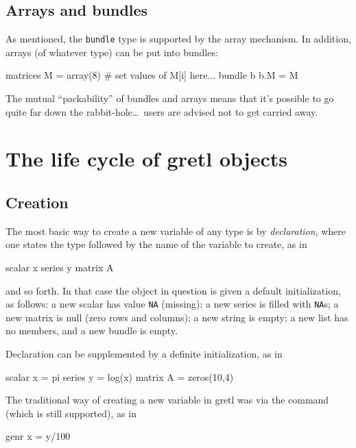 \subsection{Arrays and bundles}

As mentioned, the \texttt{bundle} type is supported by the array
mechanism. In addition, arrays (of whatever type) can be put into
bundles:
\begin{code}
matrices M = array(8)
# set values of M[i] here...
bundle b
b.M = M
\end{code}

The mutual ``packability'' of bundles and arrays means that it's
possible to go quite far down the rabbit-hole\dots\ users are advised
not to get carried away.

\section{The life cycle of gretl objects}

\subsection{Creation}

The most basic way to create a new variable of any type is by
\textit{declaration}, where one states the type followed by the name
of the variable to create, as in

\begin{code}
scalar x
series y
matrix A
\end{code}

and so forth. In that case the object in question is given a default
initialization, as follows: a new scalar has value \texttt{NA}
(missing); a new series is filled with \texttt{NA}s; a new matrix is
null (zero rows and columns); a new string is empty; a new list has no
members, and a new bundle is empty.

Declaration can be supplemented by a definite initialization, as in

\begin{code}
scalar x = pi
series y = log(x)
matrix A = zeros(10,4)
\end{code}

The traditional way of creating a new variable in gretl was via
the  command (which is still supported), as in

\begin{code}
genr x = y/100
\end{code}

